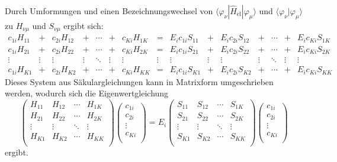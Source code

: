 \documentclass[9pt]{report}
\begin{document}
Durch Umformungen und einen Bezeichnungswechsel von $\langle\varphi_{\nu}|\hat{H}_{\mathrm{el}}|\varphi_{\mu}\rangle$ und $\langle\varphi_{\nu}|\varphi_{\mu}\rangle$ zu $H_{\nu\mu}$ und $S_{\nu\mu}$ ergibt sich:
\begin{equation}
\begin{array}{|ccccccccccccccc|}
c_{1i}H_{11} & + & c_{2i}H_{12} & + & \cdots & + & c_{Ki}H_{1K} & = & E_{i}c_{1i}S_{11} & + & E_{i}c_{2i}S_{12} & + & \cdots & + & E_{i}c_{Ki}S_{1K}\\
c_{1i}H_{21} & + & c_{2i}H_{22} & + & \cdots & + & c_{Ki}H_{2K} & = & E_{i}c_{1i}S_{21} & + & E_{i}c_{2i}S_{22} & + & \cdots & + & E_{i}c_{Ki}S_{2K}\\
\vdots &  \vdots & \vdots & \vdots & \ddots & \vdots & \vdots & \vdots & \vdots & \vdots & \vdots & \vdots & \ddots & \vdots & \vdots\\
c_{1i}H_{K1} & + & c_{2i}H_{K2} & + & \cdots & + & c_{Ki}H_{KK} & = & E_{i}c_{1i}S_{K1} & + & E_{i}c_{2i}S_{K2} & + & \cdots & + & E_{i}c_{Ki}S_{KK}
\end{array}
\end{equation}
Dieses System aus Säkulargleichungen kann in Matrixform umgeschrieben werden, wodurch sich die Eigenwertgleichung
\begin{equation}
\renewcommand{\arraystretch}{1.5}
\left(\begin{array}{cccc}H_{11} & H_{12} &\cdots & H_{1K}\\
H_{21} & H_{22} & \cdots & H_{2K}\\
\vdots &\vdots &\ddots  &\vdots \\
H_{K1} & H_{K2} & \cdots & H_{KK}
\\\end{array}\right)\left(\begin{array}{c} c_{1i} \\ c_{2i} \\ \vdots \\ c_{Ki} \\\end{array}\right)=E_i
\left(\begin{array}{cccc} S_{11} & S_{12} &\cdots & S_{1K}\\
S_{21} & S_{22} & \cdots & S_{2K}\\
\vdots &\vdots &\ddots  &\vdots \\
S_{K1} & S_{K2} & \cdots & S_{KK}
\\\end{array}\right)
\left(\begin{array}{c} c_{1i} \\ c_{2i} \\ \vdots \\ c_{Ki} \\\end{array}\right)
\end{equation}
ergibt.
\end{document}
